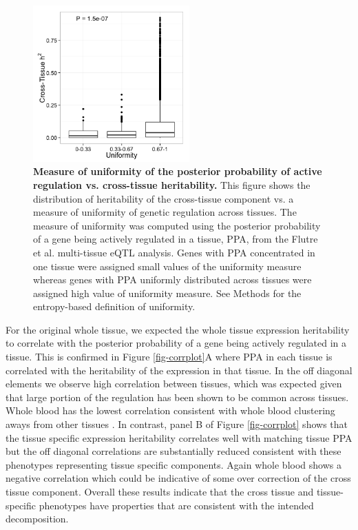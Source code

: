 \documentclass[10pt,letterpaper]{article}
\begin{document}
\begin{figure}[H]
\includegraphics[width=6cm]{Figures/Fig-CT-entropy.png}
\caption{{\bf Measure of uniformity of the posterior probability of active regulation vs. cross-tissue heritability.}
This figure shows the distribution of heritability of the cross-tissue component vs. a measure of uniformity of genetic regulation across tissues. 
The measure of uniformity was computed using the posterior probability of a gene being actively regulated in a tissue, PPA, from the Flutre et al. \cite{Flutre_2013} multi-tissue eQTL analysis. Genes with PPA concentrated in one tissue were assigned small values of the uniformity measure whereas genes with PPA uniformly distributed across tissues were assigned high value of uniformity measure. See Methods for the entropy-based definition of uniformity.}
\label{fig-ct-entropy}
\end{figure}


For the original whole tissue, we expected the whole tissue expression heritability to correlate with the posterior probability of a gene being actively regulated in a tissue. This is confirmed in Figure \ref{fig-corrplot}A where PPA in each tissue is correlated with the heritability of the expression in that tissue. In the off diagonal elements we observe high correlation between tissues, which was expected given that large portion of the regulation has been shown to be common across tissues. Whole blood has the lowest correlation  consistent with whole blood clustering aways from other tissues \cite{Ardlie_2015}. In contrast, panel B of Figure \ref{fig-corrplot} shows that the tissue specific expression heritability correlates well with matching tissue PPA but the off diagonal correlations are substantially reduced consistent with these phenotypes representing tissue specific components. Again whole blood shows a negative correlation which could be indicative of some over correction of the cross tissue component. Overall these results indicate that the cross tissue and tissue-specific phenotypes have properties that are consistent with the intended decomposition.
\end{document}
